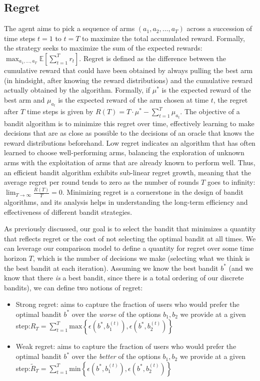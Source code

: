 \documentclass[
  letterpaper,
  numbers=noenddot,
  DIV=11,
  oneside]{scrreprt}
\theoremstyle{remark}
\begin{document}
\subsection{Regret}\label{regret}

The agent aims to pick a sequence of arms \((a_1, a_2, \ldots, a_T)\)
across a succession of time steps \(t = 1\) to \(t = T\) to maximize the
total accumulated reward. Formally, the strategy seeks to maximize the
sum of the expected rewards:
\(\max_{a_1, \ldots, a_T} \mathbb{E} \left[\sum_{t=1}^{T} r_t\right]\).
Regret is defined as the difference between the cumulative reward that
could have been obtained by always pulling the best arm (in hindsight,
after knowing the reward distributions) and the cumulative reward
actually obtained by the algorithm. Formally, if \(\mu^*\) is the
expected reward of the best arm and \(\mu_{a_t}\) is the expected reward
of the arm chosen at time \(t\), the regret after \(T\) time steps is
given by \(R(T) = T \cdot \mu^* - \sum_{t=1}^{T} \mu_{a_t}\). The
objective of a bandit algorithm is to minimize this regret over time,
effectively learning to make decisions that are as close as possible to
the decisions of an oracle that knows the reward distributions
beforehand. Low regret indicates an algorithm that has often learned to
choose well-performing arms, balancing the exploration of unknown arms
with the exploitation of arms that are already known to perform well.
Thus, an efficient bandit algorithm exhibits sub-linear regret growth,
meaning that the average regret per round tends to zero as the number of
rounds \(T\) goes to infinity:
\(\lim_{T \to \infty} \frac{R(T)}{T} = 0\). Minimizing regret is a
cornerstone in the design of bandit algorithms, and its analysis helps
in understanding the long-term efficiency and effectiveness of different
bandit strategies.

As previously discussed, our goal is to select the bandit that minimizes
a quantity that reflects regret or the cost of not selecting the optimal
bandit at all times. We can leverage our comparison model to define a
quantity for regret over some time horizon \(T\), which is the number of
decisions we make (selecting what we think is the best bandit at each
iteration). Assuming we know the best bandit \(b^*\) (and we know that
there \emph{is} a best bandit, since there is a total ordering of our
discrete bandits), we can define two notions of regret:

\begin{itemize}
\item
  Strong regret: aims to capture the fraction of users who would prefer
  the optimal bandit \(b^*\) over the \emph{worse} of the options
  \(b_1, b_2\) we provide at a given
  step:\(R_T = \sum_{t = 1}^T \text{max} \left\{ \epsilon(b^*, b_1^{(t)}), \epsilon(b^*, b_2^{(t)}) \right\}\)
\item
  Weak regret: aims to capture the fraction of users who would prefer
  the optimal bandit \(b^*\) over the \emph{better} of the options
  \(b_1, b_2\) we provide at a given
  step:\(\tilde{R}_T = \sum_{t = 1}^T \text{min} \left\{ \epsilon(b^*, b_1^{(t)}), \epsilon(b^*, b_2^{(t)}) \right\}\)
\end{itemize}
\end{document}
